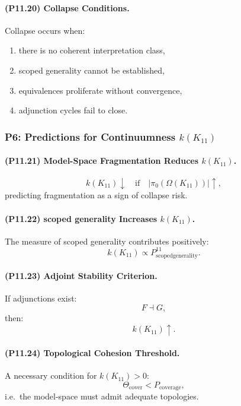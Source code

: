 \paragraph{(P11.20) Collapse Conditions.}
Collapse occurs when:
\begin{enumerate}
    \item there is no coherent interpretation class,
    \item scoped generality cannot be established,
    \item equivalences proliferate without convergence,
    \item adjunction cycles fail to close.
\end{enumerate}

\subsubsection{P6: Predictions for Continuumness $k(K_{11})$}

\paragraph{(P11.21) Model-Space Fragmentation Reduces $k(K_{11})$.}
\[
k(K_{11}) \downarrow \quad\text{if}\quad
|\pi_0(\Omega(K_{11}))| \uparrow,
\]
predicting fragmentation as a sign of collapse risk.

\paragraph{(P11.22) scoped generality Increases $k(K_{11})$.}
The measure of scoped generality contributes positively:
\[
k(K_{11}) \propto
P_{\mathrm{scoped generality}}^{11}.
\]

\paragraph{(P11.23) Adjoint Stability Criterion.}
If adjunctions exist:
\[
F \dashv G,
\]
then:
\[
k(K_{11}) \uparrow.
\]

\paragraph{(P11.24) Topological Cohesion Threshold.}
A necessary condition for $k(K_{11}) > 0$:
\[
\Theta_{\mathrm{cover}} < P_{\mathrm{coverage}},
\]
i.e.\ the model-space must admit adequate topologies.

